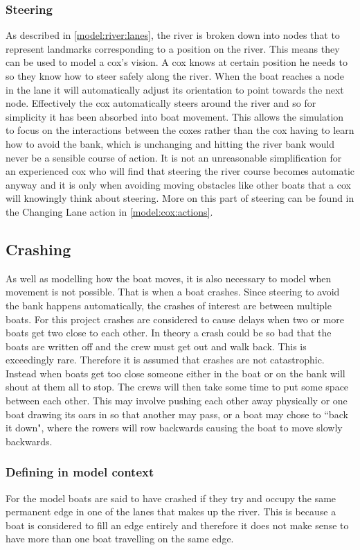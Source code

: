       \subsubsection{Steering}
      As described in \ref{model:river:lanes}, the river is broken down into nodes that to represent landmarks corresponding to a position on the river. This means they can be used to model a cox's vision. A cox knows at certain position he needs to so they know how to steer safely along the river. When the boat reaches a node in the lane it will automatically adjust its orientation to point towards the next node. Effectively the cox automatically steers around the river and so for simplicity it has been absorbed into boat movement. This allows the simulation to focus on the interactions between the coxes rather than the cox having to learn how to avoid the bank, which is unchanging and hitting the river bank would never be a sensible course of action. It is not an unreasonable simplification for an experienced cox who will find that steering the river course becomes automatic anyway and it is only when avoiding moving obstacles like other boats that a cox will knowingly think about steering. More on this part of steering can be found in the Changing Lane action in \ref{model:cox:actions}.
      
      \subsection{Crashing}\label{model:movement:crashing}
      As well as modelling how the boat moves, it is also necessary to model when movement is not possible. That is when a boat crashes. Since steering to avoid the bank happens automatically, the crashes of interest are between multiple boats. For this project crashes are considered to cause delays when two or more boats get two close to each other. In theory a crash could be so bad that the boats are written off and the crew must get out and walk back. This is exceedingly rare. Therefore it is assumed that crashes are not catastrophic. Instead when boats get too close someone either in the boat or on the bank will shout at them all to stop. The crews will then take some time to put some space between each other. This may involve pushing each other away physically or one boat drawing its oars in so that another may pass, or a boat may chose to ``back it down", where the rowers will row backwards causing the boat to move slowly backwards.
        
      \subsubsection{Defining in model context}
      For the model boats are said to have crashed if they try and occupy the same permanent edge in one of the lanes that makes up the river. This is because a boat is considered to fill an edge entirely and therefore it does not make sense to have more than one boat travelling on the same edge.

